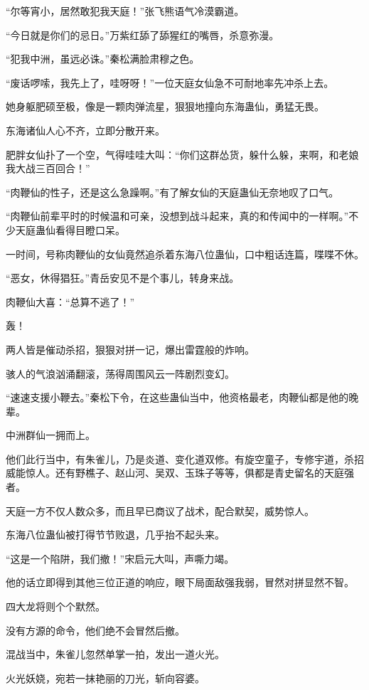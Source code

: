 \begin{this_body}
“尔等宵小，居然敢犯我天庭！”张飞熊语气冷漠霸道。

“今日就是你们的忌日。”万紫红舔了舔猩红的嘴唇，杀意弥漫。

“犯我中洲，虽远必诛。”秦松满脸肃穆之色。

“废话啰嗦，我先上了，哇呀呀！”一位天庭女仙急不可耐地率先冲杀上去。

她身躯肥硕至极，像是一颗肉弹流星，狠狠地撞向东海蛊仙，勇猛无畏。

东海诸仙人心不齐，立即分散开来。

肥胖女仙扑了一个空，气得哇哇大叫：“你们这群怂货，躲什么躲，来啊，和老娘我大战三百回合！”

“肉鞭仙的性子，还是这么急躁啊。”有了解女仙的天庭蛊仙无奈地叹了口气。

“肉鞭仙前辈平时的时候温和可亲，没想到战斗起来，真的和传闻中的一样啊。”不少天庭蛊仙看得目瞪口呆。

一时间，号称肉鞭仙的女仙竟然追杀着东海八位蛊仙，口中粗话连篇，喋喋不休。

“恶女，休得猖狂。”青岳安见不是个事儿，转身来战。

肉鞭仙大喜：“总算不逃了！”

轰！

两人皆是催动杀招，狠狠对拼一记，爆出雷霆般的炸响。

骇人的气浪汹涌翻滚，荡得周围风云一阵剧烈变幻。

“速速支援小鞭去。”秦松下令，在这些蛊仙当中，他资格最老，肉鞭仙都是他的晚辈。

中洲群仙一拥而上。

他们此行当中，有朱雀儿，乃是炎道、变化道双修。有旋空童子，专修宇道，杀招威能惊人。还有野樵子、赵山河、吴双、玉珠子等等，俱都是青史留名的天庭强者。

天庭一方不仅人数众多，而且早已商议了战术，配合默契，威势惊人。

东海八位蛊仙被打得节节败退，几乎抬不起头来。

“这是一个陷阱，我们撤！”宋启元大叫，声嘶力竭。

他的话立即得到其他三位正道的响应，眼下局面敌强我弱，冒然对拼显然不智。

四大龙将则个个默然。

没有方源的命令，他们绝不会冒然后撤。

混战当中，朱雀儿忽然单掌一拍，发出一道火光。

火光妖娆，宛若一抹艳丽的刀光，斩向容婆。


\end{this_body}
